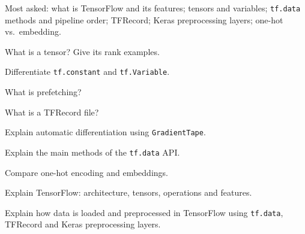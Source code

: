 \begin{imp}
Most asked: what is TensorFlow and its features; tensors and variables; \texttt{tf.data} methods and pipeline order; TFRecord; Keras preprocessing layers; one-hot vs.\ embedding.
\end{imp}

\begin{iq}
\item \twom What is a tensor? Give its rank examples.
\item \twom Differentiate \texttt{tf.constant} and \texttt{tf.Variable}.
\item \twom What is prefetching?
\item \twom What is a TFRecord file?
\item \fivem Explain automatic differentiation using \texttt{GradientTape}.
\item \fivem Explain the main methods of the \texttt{tf.data} API.
\item \fivem Compare one-hot encoding and embeddings.
\item \tenm Explain TensorFlow: architecture, tensors, operations and features.
\item \tenm Explain how data is loaded and preprocessed in TensorFlow using \texttt{tf.data}, TFRecord and Keras preprocessing layers.
\end{iq}
